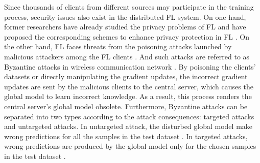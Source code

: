 \documentclass[journal]{IEEEtran}
\begin{document}
\par Since thousands of clients from different sources may participate in the training process, security issues also exist in the distributed FL system. On one hand, former researchers have already studied the privacy problems of FL and have proposed the corresponding schemes to enhance privacy protection in FL \cite{ref_33_privacy, ref_34_VerifyNet, wang2019beyond}. On the other hand, FL faces threats from the poisoning attacks launched by malicious attackers among the FL clients \cite{miao2018attack, laishram2016curie}. And such attacks are referred to as Byzantine attacks in wireless communication network \cite{ref_36_Byzantine,ref_37_Byzantine,ref_38_Byzantine,ref_40_Byzantine}. By poisoning the clients' datasets or directly manipulating the gradient updates, the incorrect gradient updates are sent by the malicious clients to the central server, which causes the global model to learn incorrect knowledge. As a result, this process renders the central server's global model obsolete. Furthermore, Byzantine attacks can be separated into two types according to the attack consequences: targeted attacks and untargeted attacks. In untargeted attack, the disturbed global model make wrong predictions for all the samples in the test dataset \cite{ref_04_model,ref_06_model,ref_07_data,yang2017generative,sun2018data}. In targeted attacks, wrong predictions are produced by the global model only for the chosen samples in the test dataset \cite{ref_08_data,ref_09_backdoor,ref_10_backdoor,ref_11_backdoor,ref_19_backdoor}.
\end{document}
